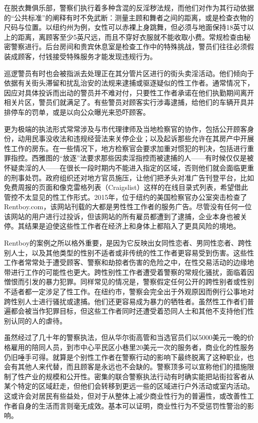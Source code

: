 \documentclass[fontset=fandol, a4paper, 12pt, openright]{ctexbook}
\begin{document}
在脱衣舞俱乐部，警察们执行着多种含混的反淫秽法规，而他们对作为其行动依据的“公共标准”的阐释有时不免武断：测量主顾和舞者之间的距离，或是检查衣物的尺码与位置。以纽约州为例，女性可以赤裸上身跳舞，但必须与地面保持18英寸以上的距离，离顾客至少5英尺远，而且不穿好衣服就不能收取小费。常规检查由秘密警察进行。后台房间和贵宾休息室是检查工作中的特殊挑战，警员们往往必须假装成顾客，付钱接受特殊服务才能发现违规行为。

巡逻警员有时也会被指派去处理正在其分管片区进行的街头卖淫活动。他们倾向于依据有关街头滞留和扰乱治安的法规来逮捕或驱逐疑似的性工作者。通常情况下，因应对具体投诉而出动的警员并不难对付，只要性工作者承诺在他们执勤期间离开相关片区，警员们就满足了。有些警员对顾客实行涉毒逮捕，给他们的车辆开具并排停车的罚单，或是以向公众曝光来恐吓顾客。

更为极端的执法形式常常涉及与市代理律师及当地检察官的协作，包括公开顾客身份，动用民事没收法和违规经营法来关停企业；以及起诉那些允许在其房产中开展性工作的房东。在一些情况下，地方检察官会要求加重对惯犯的判决，包括进行重罪指控。西雅图的“放逐”法要求那些因卖淫指控而被逮捕的人——有时候仅仅是被怀疑卖淫的人——在很长一段时期内不能进入指定的区域，否则他们就会面临更重的刑事处罚。政府组织还对地方官员施压，让他们把矛头对准广告刊登平台，比如免费周报的页面和像克雷格列表（Craigslist）这样的在线目录式列表，希望借此管控不太显见的性工作形式。2015年，位于纽约的美国检察官办公室突击检查了Rentboy.com，该网站刊载的大都是男性性工作者的服务广告。尽管没有任何一位该网站的用户进行过投诉，但该网站的所有雇员都遭到了逮捕，企业本身也被关停。其结果是迫使这些性工作者在经济上和身体上都陷入了更具风险的境地。

Rentboy的案例之所以格外重要，是因为它反映出女同性恋者、男同性恋者、跨性别人士，以及其他类型的性别不适者或非传统的性工作者更容易受到伤害。这些性工作者常常处于遭受顾客、警察和劫掠者伤害的危险之中，在性交易活动的边缘地带进行工作的可能性也更大。跨性别性工作者遭受着警察的常规化骚扰，面临着因憎恨而引发的暴力犯罪。同样常见的情况是，警察假定任何公开的跨性别者或性别不适者都一定涉足了性工作。在纽约市，警察会完全出于外观原因而例行公事地对跨性别人士进行骚扰或逮捕。他们还更容易成为暴力的牺牲者。虽然性工作者们普遍都会被当作犯罪目标，但这些工作者同时还遭受着恐同人士和其他不支持他们性别认同的人的虐待。

虽然经过了几十年的警察执法，但从华尔街高管和当选官员们以5000美元一晚的价格雇用的陪同人员，到市中心平民区小巷里20美元一次的服务者，商业化的性服务仍旧唾手可得。就算是个别性工作者在警察行动的影响下最终脱离了这种职业，也会有其他人来代替，而且顾客是永远也不会缺的。警察顶多可以宣称他们的措施限制了性产业的规模和公开性。密集的联合警察执法行动有时确实能把站街拉客者从某个特定的区域赶走，但他们会转移到更远一些的区域进行户外活动或室内活动。这或许会对居民有些益处，但对于从整体上减少商业性行为的普遍性，或改善性工作者自身的生活而言则毫无成效。基本可以证明，商业性行为不受惩罚性警治的影响。
\end{document}
